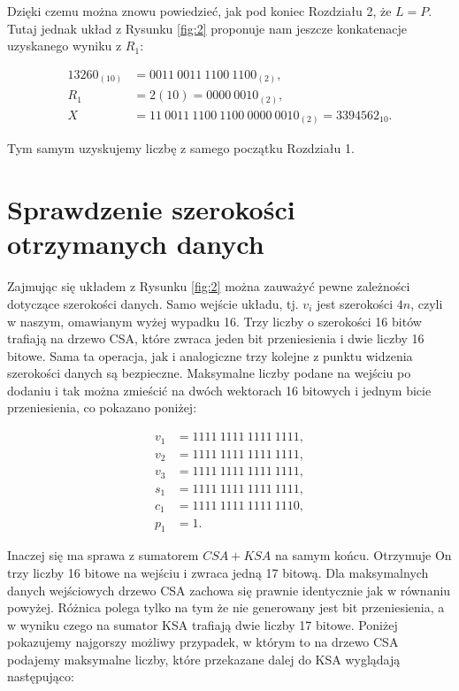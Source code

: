 \documentclass[comsoc]{IEEEtran}
\begin{document}
	Dzięki czemu można znowu powiedzieć, jak pod koniec Rozdziału 2, że $L=P$. Tutaj jednak układ z Rysunku \ref{fig:2} proponuje  nam jeszcze konkatenacje uzyskanego wyniku z $R_{1}$:
	
	\begin{equation} \label{eq:csa4}
	\begin{aligned}
	13260_{(10)}& = 0011~0011~1100~1100_{(2)},\\
	R_{1}& = 2{(10)} = 0000~0010_{(2)},\\
	X& = 11~0011~1100~1100~0000~0010_{(2)}=3394562_{10}.
	\end{aligned}
	\end{equation}
	
	Tym samym uzyskujemy liczbę z samego początku Rozdziału 1.
	
	\section{Sprawdzenie szerokości otrzymanych danych}
	
	Zajmując się układem z Rysunku \ref{fig:2} można zauważyć pewne zależności dotyczące szerokości danych. Samo wejście układu, tj. $v_{i}$ jest szerokości $4n$, czyli w naszym, omawianym wyżej wypadku 16. Trzy liczby o szerokości 16 bitów trafiają na drzewo CSA, które zwraca jeden bit przeniesienia i dwie liczby 16 bitowe. Sama ta operacja, jak i analogiczne trzy kolejne z punktu widzenia szerokości danych są bezpieczne. Maksymalne liczby podane na wejściu po dodaniu i tak można zmieścić na dwóch wektorach 16 bitowych i jednym bicie przeniesienia, co pokazano poniżej:
	
	\begin{equation} \label{eq:csaMaks}
	\begin{aligned}
	v_{1}& = 1111~1111~1111~1111,\\
	v_{2}& = 1111~1111~1111~1111,\\
	v_{3}& = 1111~1111~1111~1111,\\
	s_{1}& = 1111~1111~1111~1111,\\
	c_{1}& = 1111~1111~1111~1110,\\
	p_{1}& = 1.
	\end{aligned}
	\end{equation}
	
	Inaczej się ma sprawa z sumatorem $CSA+KSA$ na samym końcu. Otrzymuje On trzy liczby 16 bitowe na wejściu i zwraca jedną 17 bitową. Dla maksymalnych danych wejściowych drzewo CSA zachowa się prawnie identycznie jak w równaniu powyżej. Różnica polega tylko na tym że nie generowany jest bit przeniesienia, a w wyniku czego na sumator KSA trafiają dwie liczby 17 bitowe. Poniżej pokazujemy najgorszy możliwy przypadek, w którym to na drzewo CSA podajemy maksymalne liczby, które przekazane dalej do KSA wyglądają następująco:
	
\end{document}

